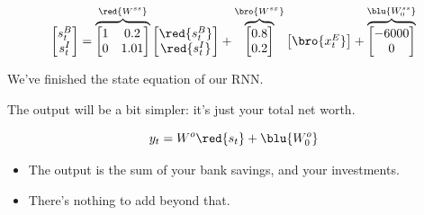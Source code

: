         \begin{equation}
            \begin{bmatrix}
                s^{B}_t \\ s^{I}_t
            \end{bmatrix}
            =
            \overbrace{
                \begin{bmatrix}
                    1 & 0.2 \\
                    0 & 1.01
                \end{bmatrix}
            }^{\red{W^{ss}}}
            \begin{bmatrix}
                \red{s^{B}_t} \\ \red{s^{I}_t}
            \end{bmatrix}
            + 
            \overbrace{
                \begin{bmatrix}
                    0.8 \\ 0.2
                \end{bmatrix}
            }^{\bro{W^{sx}}}
            \begin{bmatrix}
                \bro{x_{t}^{E}}
            \end{bmatrix}
            +
            \overbrace{
                \begin{bmatrix}
                    -6000 \\ 0
                \end{bmatrix}
            }^{\blu{W^{ss}_0}}
        \end{equation}

        We've finished the state equation of our RNN.

        \subsecdiv

        The output will be a bit simpler: it's just your total net worth.

        \begin{equation}
            y_t = W^o\red{s_t} + \blu{W^o_0} 
        \end{equation}

        \begin{itemize}
            \item The output is the sum of your bank savings, and your investments.
            \item There's nothing to add beyond that.
        \end{itemize}

